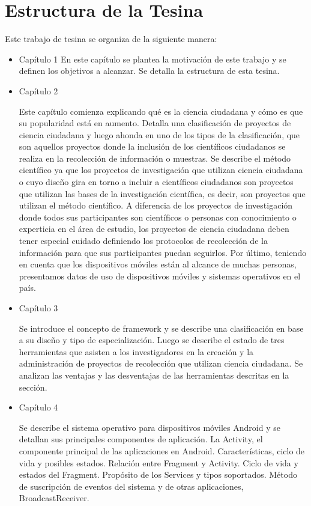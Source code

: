 \section{ Estructura de la Tesina }
Este trabajo de tesina se organiza de la siguiente manera:
\begin{itemize} 
	\item{Capítulo 1} 
		 En este capítulo se plantea la motivación de este trabajo y se definen los objetivos a alcanzar. Se detalla la estructura de esta tesina.

	\item{Capítulo 2} 
		
		Este capítulo comienza explicando qué es la ciencia ciudadana y cómo es que su popularidad está en aumento. Detalla una clasificación de proyectos de ciencia ciudadana y luego ahonda en uno de los tipos de la clasificación, que son aquellos proyectos donde la inclusión de los científicos ciudadanos se realiza en la recolección de información o muestras. Se describe el método científico ya que los proyectos de investigación que utilizan ciencia ciudadana o cuyo diseño gira en torno a incluir a científicos ciudadanos son proyectos que utilizan las bases de la investigación científica, es decir, son proyectos que utilizan el método científico. A diferencia de los proyectos de investigación donde todos sus participantes son científicos o personas con conocimiento o experticia en el área de estudio, los proyectos de ciencia ciudadana deben tener especial cuidado definiendo los protocolos de recolección de la información para que sus participantes puedan seguirlos. Por último, teniendo en cuenta que los dispositivos móviles están al alcance de muchas personas, presentamos datos de uso de dispositivos móviles y sistemas operativos en el país.
		
	
	\item{Capítulo 3} 
		
		Se introduce el concepto de framework y se describe una clasificación en base a su diseño y tipo de especialización. Luego se describe el estado de tres herramientas que asisten a los investigadores en la creación y la administración de proyectos de recolección que utilizan ciencia ciudadana. Se analizan las ventajas y las desventajas de las herramientas descritas en la sección.
		
	
	\item{Capítulo 4} 
		
		Se describe el sistema operativo para dispositivos móviles Android y se detallan sus principales componentes de aplicación. La Activity, el componente principal de las aplicaciones en Android. Características, ciclo de vida y posibles estados. Relación entre Fragment y Activity. Ciclo de vida y estados del Fragment. Propósito de los Services y tipos soportados. Método de suscripción de eventos del sistema y de otras aplicaciones, BroadcastReceiver. 
		 


\end{itemize}

